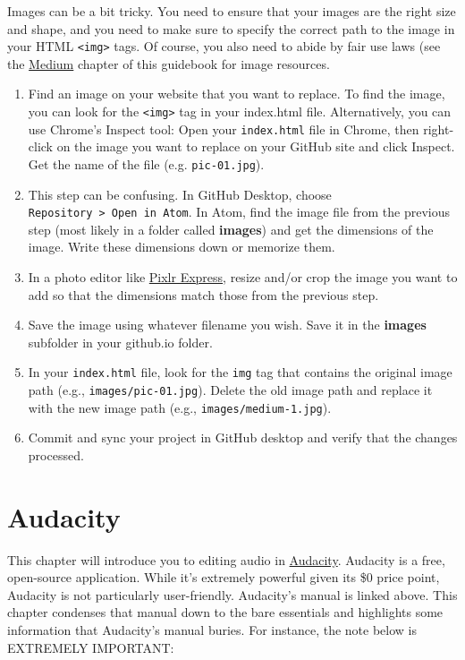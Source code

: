 \documentclass[]{book}
\providecommand{\tightlist}{%
  \setlength{\itemsep}{0pt}\setlength{\parskip}{0pt}}
\theoremstyle{definition}
\theoremstyle{definition}
\theoremstyle{definition}
\theoremstyle{remark}
\begin{document}
Images can be a bit tricky. You need to ensure that your images are the
right size and shape, and you need to make sure to specify the correct
path to the image in your HTML \texttt{\textless{}img\textgreater{}}
tags. Of course, you also need to abide by fair use laws (see the
\href{https://andylaut.github.io/3844-guidebook/medium.html\#using-images-resources-and-fair-use-guidelines}{Medium}
chapter of this guidebook for image resources.

\begin{enumerate}
\def\labelenumi{\arabic{enumi}.}
\tightlist
\item
  Find an image on your website that you want to replace. To find the
  image, you can look for the \texttt{\textless{}img\textgreater{}} tag
  in your index.html file. Alternatively, you can use Chrome's Inspect
  tool: Open your \texttt{index.html} file in Chrome, then right-click
  on the image you want to replace on your GitHub site and click
  Inspect. Get the name of the file (e.g. \texttt{pic-01.jpg}).
\item
  This step can be confusing. In GitHub Desktop, choose
  \texttt{Repository\ \textgreater{}\ Open\ in\ Atom}. In Atom, find the
  image file from the previous step (most likely in a folder called
  \textbf{images}) and get the dimensions of the image. Write these
  dimensions down or memorize them.
\item
  In a photo editor like \href{https://pixlr.com/express/}{Pixlr
  Express}, resize and/or crop the image you want to add so that the
  dimensions match those from the previous step.
\item
  Save the image using whatever filename you wish. Save it in the
  \textbf{images} subfolder in your github.io folder.
\item
  In your \texttt{index.html} file, look for the \texttt{img} tag that
  contains the original image path (e.g., \texttt{images/pic-01.jpg}).
  Delete the old image path and replace it with the new image path
  (e.g., \texttt{images/medium-1.jpg}).
\item
  Commit and sync your project in GitHub desktop and verify that the
  changes processed.
\end{enumerate}

\hypertarget{audacity}{%
\chapter{Audacity}\label{audacity}}

This chapter will introduce you to editing audio in
\href{https://manual.audacityteam.org/}{Audacity}. Audacity is a free,
open-source application. While it's extremely powerful given its \$0
price point, Audacity is not particularly user-friendly. Audacity's
manual is linked above. This chapter condenses that manual down to the
bare essentials and highlights some information that Audacity's manual
buries. For instance, the note below is EXTREMELY IMPORTANT:
\end{document}
